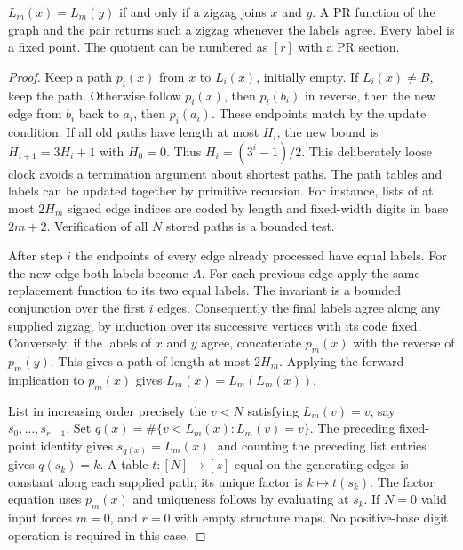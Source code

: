 \begin{lemma}
\label{lem:label-exact}
$L_m(x)=L_m(y)$ if and only if a zigzag joins $x$ and $y$. A PR function of the graph and the pair returns such a zigzag whenever the labels agree. Every label is a fixed point. The quotient can be numbered as $[r]$ with a PR section.
\end{lemma}
\begin{proof}
Keep a path $p_i(x)$ from $x$ to $L_i(x)$, initially empty. If $L_i(x)\ne B$, keep the path. Otherwise follow $p_i(x)$, then $p_i(b_i)$ in reverse, then the new edge from $b_i$ back to $a_i$, then $p_i(a_i)$. These endpoints match by the update condition. If all old paths have length at most $H_i$, the new bound is $H_{i+1}=3H_i+1$ with $H_0=0$. Thus $H_i=(3^i-1)/2$. This deliberately loose clock avoids a termination argument about shortest paths. The path tables and labels can be updated together by primitive recursion. For instance, lists of at most $2H_m$ signed edge indices are coded by length and fixed-width digits in base $2m+2$. Verification of all $N$ stored paths is a bounded test.

After step $i$ the endpoints of every edge already processed have equal labels. For the new edge both labels become $A$. For each previous edge apply the same replacement function to its two equal labels. The invariant is a bounded conjunction over the first $i$ edges. Consequently the final labels agree along any supplied zigzag, by induction over its successive vertices with its code fixed. Conversely, if the labels of $x$ and $y$ agree, concatenate $p_m(x)$ with the reverse of $p_m(y)$. This gives a path of length at most $2H_m$. Applying the forward implication to $p_m(x)$ gives $L_m(x)=L_m(L_m(x))$.

List in increasing order precisely the $v<N$ satisfying $L_m(v)=v$, say $s_0,\ldots,s_{r-1}$. Set $q(x)=\#\{v<L_m(x):L_m(v)=v\}$. The preceding fixed-point identity gives $s_{q(x)}=L_m(x)$, and counting the preceding list entries gives $q(s_k)=k$. A table $t:[N]\to[z]$ equal on the generating edges is constant along each supplied path; its unique factor is $k\mapsto t(s_k)$. The factor equation uses $p_m(x)$ and uniqueness follows by evaluating at $s_k$. If $N=0$ valid input forces $m=0$, and $r=0$ with empty structure maps. No positive-base digit operation is required in this case.
\end{proof}

